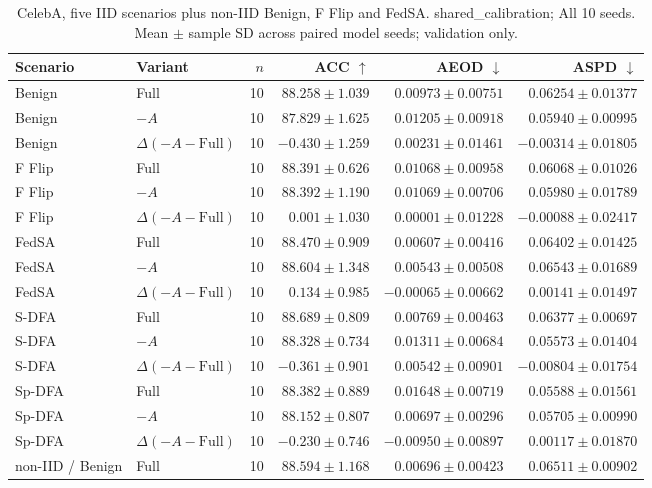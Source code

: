 \begin{table}[t]
\centering
\small
\caption{CelebA, five IID scenarios plus non-IID Benign, F Flip and FedSA. shared\_calibration; All 10 seeds. Mean $\pm$ sample SD across paired model seeds; validation only.}
\begin{tabular}{llrrrr}
\toprule
Scenario & Variant & $n$ & ACC $\uparrow$ & AEOD $\downarrow$ & ASPD $\downarrow$ \\
\midrule
Benign & Full & 10 & $88.258 \pm 1.039$ & $0.00973 \pm 0.00751$ & $0.06254 \pm 0.01377$ \\
Benign & $-A$ & 10 & $87.829 \pm 1.625$ & $0.01205 \pm 0.00918$ & $0.05940 \pm 0.00995$ \\
Benign & $\Delta(-A-\mathrm{Full})$ & 10 & $-0.430 \pm 1.259$ & $0.00231 \pm 0.01461$ & $-0.00314 \pm 0.01805$ \\
F Flip & Full & 10 & $88.391 \pm 0.626$ & $0.01068 \pm 0.00958$ & $0.06068 \pm 0.01026$ \\
F Flip & $-A$ & 10 & $88.392 \pm 1.190$ & $0.01069 \pm 0.00706$ & $0.05980 \pm 0.01789$ \\
F Flip & $\Delta(-A-\mathrm{Full})$ & 10 & $0.001 \pm 1.030$ & $0.00001 \pm 0.01228$ & $-0.00088 \pm 0.02417$ \\
FedSA & Full & 10 & $88.470 \pm 0.909$ & $0.00607 \pm 0.00416$ & $0.06402 \pm 0.01425$ \\
FedSA & $-A$ & 10 & $88.604 \pm 1.348$ & $0.00543 \pm 0.00508$ & $0.06543 \pm 0.01689$ \\
FedSA & $\Delta(-A-\mathrm{Full})$ & 10 & $0.134 \pm 0.985$ & $-0.00065 \pm 0.00662$ & $0.00141 \pm 0.01497$ \\
S-DFA & Full & 10 & $88.689 \pm 0.809$ & $0.00769 \pm 0.00463$ & $0.06377 \pm 0.00697$ \\
S-DFA & $-A$ & 10 & $88.328 \pm 0.734$ & $0.01311 \pm 0.00684$ & $0.05573 \pm 0.01404$ \\
S-DFA & $\Delta(-A-\mathrm{Full})$ & 10 & $-0.361 \pm 0.901$ & $0.00542 \pm 0.00901$ & $-0.00804 \pm 0.01754$ \\
Sp-DFA & Full & 10 & $88.382 \pm 0.889$ & $0.01648 \pm 0.00719$ & $0.05588 \pm 0.01561$ \\
Sp-DFA & $-A$ & 10 & $88.152 \pm 0.807$ & $0.00697 \pm 0.00296$ & $0.05705 \pm 0.00990$ \\
Sp-DFA & $\Delta(-A-\mathrm{Full})$ & 10 & $-0.230 \pm 0.746$ & $-0.00950 \pm 0.00897$ & $0.00117 \pm 0.01870$ \\
non-IID / Benign & Full & 10 & $88.594 \pm 1.168$ & $0.00696 \pm 0.00423$ & $0.06511 \pm 0.00902$ \\

\end{tabular}
\end{table}
